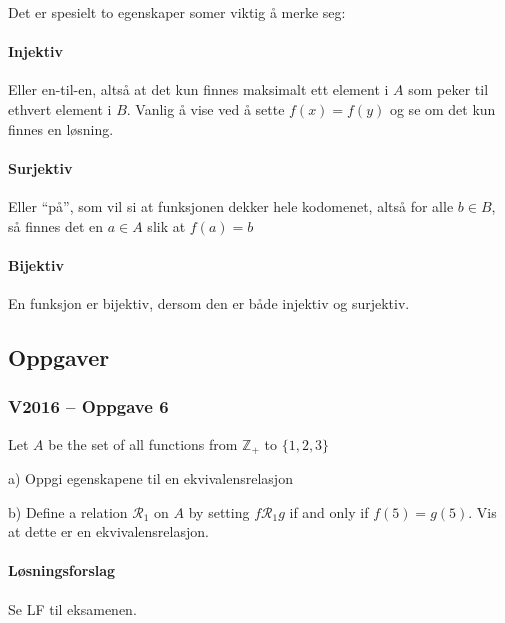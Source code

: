 Det er spesielt to egenskaper somer viktig å merke seg:

\paragraph*{Injektiv} Eller en-til-en, altså at det kun finnes maksimalt ett element i $A$ som peker til ethvert element i $B$. Vanlig å vise ved å sette $f(x)=f(y)$ og se om det kun finnes en løsning.
\paragraph*{Surjektiv} Eller \enquote{på}, som vil si at funksjonen dekker hele kodomenet, altså for alle $b\in B$, så finnes det en $a\in A$ slik at $f(a)=b$
\paragraph*{Bijektiv} En funksjon er bijektiv, dersom den er både injektiv og surjektiv.


\subsection{Oppgaver}

\subsubsection{V2016 – Oppgave 6}
Let $A$ be the set of all functions from $\mathbb{Z}_+$ to $\{1,2,3\}$

a) Oppgi egenskapene til en ekvivalensrelasjon

b) Define a relation $\mathcal{R}_1$ on $A$ by setting $f\mathcal{R}_1 g$ if and only if $f(5)=g(5)$. Vis at dette er en ekvivalensrelasjon.

\paragraph*{Løsningsforslag}
Se LF til eksamenen.